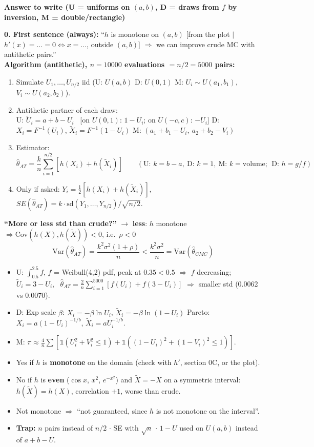 \documentclass[10pt]{article}
\newcommand{\trap}[1]{\textcolor{trap}{\textbf{Trap:} #1}}
\newcommand{\sub}[1]{\par\vspace{4pt}{\bfseries #1}\par\vspace{1pt}}
\newcommand{\one}{\mathbb{1}}
\newenvironment{answer}[1][Answer to write]{\par\vspace{2pt}\begin{shaded}\small\textbf{#1}\par\vspace{1pt}}{\end{shaded}\vspace{-2pt}}
\begin{document}
\begin{answer}[Answer to write \quad (U = uniforms on $(a,b)$, D = draws from $f$ by inversion, M = double/rectangle)]
\textbf{0. First sentence (always):} ``$h$ is monotone on $(a,b)$ [from the plot $|$ $h'(x)=\dots=0\Leftrightarrow x=\dots$, outside $(a,b)$] $\Rightarrow$ we can improve crude MC with antithetic pairs.''\\[2pt]
\textbf{Algorithm (antithetic), $n=10000$ evaluations $=n/2=5000$ pairs:}
\begin{enumerate}
\item Simulate $U_1,\dots,U_{n/2}$ iid \quad (U: $U(a,b)$ \quad D: $U(0,1)$ \quad M: $U_i\sim U(a_1,b_1)$, $V_i\sim U(a_2,b_2)$).
\item Antithetic partner of each draw:\\
U: $\tilde U_i=a+b-U_i$ \ [on $U(0,1)$: $1-U_i$; on $U(-c,c)$: $-U_i$] \quad D: $X_i=F^{-1}(U_i)$, $\tilde X_i=F^{-1}(1-U_i)$ \quad M: $(a_1+b_1-U_i,\ a_2+b_2-V_i)$
\item Estimator:
\[\hat\theta_{AT}=\frac{k}{n}\sum_{i=1}^{n/2}\left[h(X_i)+h(\tilde X_i)\right] \qquad (\text{U: } k=b-a,\ \text{D: } k=1,\ \text{M: } k=\text{volume};\ \ \text{D: } h=g/f)\]
\item Only if asked: $Y_i=\tfrac12[h(X_i)+h(\tilde X_i)]$, \ $SE(\hat\theta_{AT})=k\cdot\mathrm{sd}(Y_1,\dots,Y_{n/2})/\sqrt{n/2}$.
\end{enumerate}
\textbf{``More or less std than crude?''} $\to$ \textbf{less}: $h$ monotone $\Rightarrow \mathrm{Cov}(h(X),h(\tilde X))<0$, i.e.\ $\rho<0$
\[\mathrm{Var}(\hat\theta_{AT})=\frac{k^2\sigma^2(1+\rho)}{n}<\frac{k^2\sigma^2}{n}=\mathrm{Var}(\hat\theta_{CMC})\]
\end{answer}
\sub{Worked examples}
\begin{itemize}
\item U: $\int_{0.5}^{2.5}f$, $f$ = Weibull(4,2) pdf, peak at $0.35<0.5$ $\Rightarrow$ $f$ decreasing; $\tilde U_i=3-U_i$, \ $\hat\theta_{AT}=\frac2n\sum_{i=1}^{5000}[f(U_i)+f(3-U_i)]$ $\Rightarrow$ smaller std (0.0062 vs 0.0070).
\item D: Exp scale $\beta$: $X_i=-\beta\ln U_i$, $\tilde X_i=-\beta\ln(1-U_i)$ \quad Pareto: $X_i=a(1-U_i)^{-1/b}$, $\tilde X_i=aU_i^{-1/b}$.
\item M: $\pi\approx\frac4n\sum\left[\one(U_i^2+V_i^2\le1)+\one((1-U_i)^2+(1-V_i)^2\le1)\right]$.
\end{itemize}
\sub{``Does it work?''}
\begin{itemize}
\item Yes if $h$ is \textbf{monotone} on the domain (check with $h'$, section 0C, or the plot).
\item No if $h$ is \textbf{even} ($\cos x$, $x^2$, $e^{-x^2}$) and $\tilde X=-X$ on a symmetric interval: $h(\tilde X)=h(X)$, correlation $+1$, worse than crude.
\item Not monotone $\Rightarrow$ ``not guaranteed, since $h$ is not monotone on the interval''.
\item \trap{$n$ pairs instead of $n/2$ $\cdot$ SE with $\sqrt n$ $\cdot$ $1-U$ used on $U(a,b)$ instead of $a+b-U$.}
\end{itemize}
\end{document}
